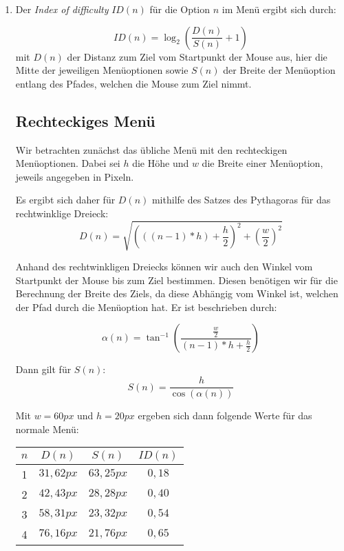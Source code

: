 \documentclass[a4paper,10pt]{article}
\begin{document}
\kopf
\renewcommand{\figurename}{Figure}


\begin{enumerate}
\item Der \textit{Index of difficulty} $ID(n)$ für die Option $n$ im Menü ergibt sich durch:

\begin{equation} \label{eq:id}
ID(n) = \log_{2} \left( \frac{D(n)}{S(n)} + 1 \right)
\end{equation}
mit $D(n)$ der Distanz zum Ziel vom Startpunkt der Mouse aus, hier die Mitte der jeweiligen Menüoptionen sowie $S(n)$ der Breite der Menüoption entlang des Pfades, welchen die Mouse zum Ziel nimmt.

\subsection*{Rechteckiges Menü}

Wir betrachten zunächst das übliche Menü mit den rechteckigen Menüoptionen. Dabei sei $h$ die Höhe und $w$ die Breite einer Menüoption, jeweils angegeben in Pixeln.

Es ergibt sich daher für $D(n)$ mithilfe des Satzes des Pythagoras für das rechtwinklige Dreieck:
\begin{equation}
D(n) = \sqrt{ \left(\left(\left(n - 1\right) * h\right) + \frac{h}{2}\right)^{2} + \left( \frac{w}{2}\right)^{2}}
\end{equation}

Anhand des rechtwinkligen Dreiecks können wir auch den Winkel vom Startpunkt der Mouse bis zum Ziel bestimmen. Diesen benötigen wir für die Berechnung der Breite des Ziels, da diese Abhängig vom Winkel ist, welchen der Pfad durch die Menüoption hat. Er ist beschrieben durch:

\begin{equation}
\alpha(n) = \tan^{-1}\left( \frac{\frac{w}{2}}{(n - 1) * h + \frac{h}{2}} \right)
\end{equation}

Dann gilt für $S(n)$:
\begin{equation}
S(n) = \frac{h}{\cos\left(\alpha(n)\right)}
\end{equation}

Mit $w = 60px$ und $h = 20px$ ergeben sich dann folgende Werte für das normale Menü:

\begin{center}
\begin{tabular}{|c|c|c|c|}
\hline
$n$ & $D(n)$ & $S(n)$ & $ ID(n)$ \\
\hline
1 & $31,62px$ & $63,25px$ & $0,18$ \\
2 & $42,43px$ & $28,28px$ & $0,40$ \\
3 & $58,31px$ & $23,32px$ & $0,54$ \\
4 & $76,16px$ & $21,76px$ & $0,65$ \\
\hline
\end{tabular}
\end{center}


\end{enumerate}
\end{document}

